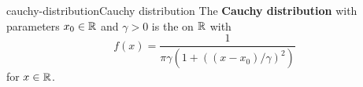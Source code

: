 \begin{topic}{cauchy-distribution}{Cauchy distribution}
    The \textbf{Cauchy distribution} with parameters $x_0 \in \mathbb{R}$ and $\gamma > 0$ is the  on $\mathbb{R}$ with 
    \[ f(x) = \frac{1}{\pi \gamma (1 + ((x - x_0) / \gamma)^2)} \]
    for $x \in \mathbb{R}$.
\end{topic}

    
